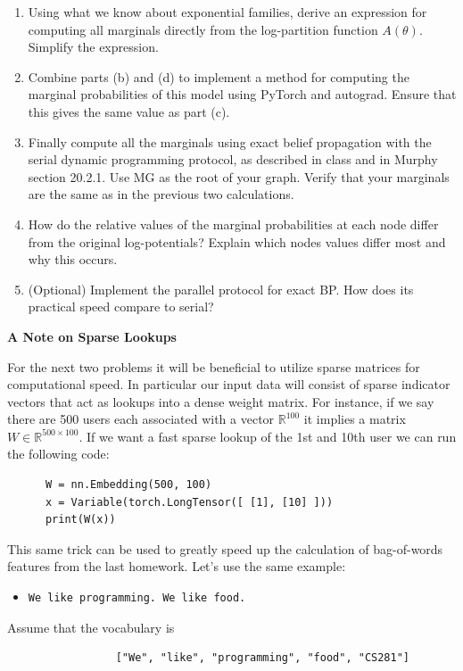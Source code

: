\documentclass[10pt]{harvardml}
\theoremstyle{plain}
\begin{document}
\begin{problem}[30pts]
\begin{enumerate}[label=(\alph*)]
\item Using what we know about exponential families, derive an
  expression for computing all marginals directly from the
  log-partition function $A(\theta)$. Simplify the expression.

\item Combine parts (b) and (d) to implement a method for computing
  the marginal probabilities of this model using PyTorch and
  autograd. Ensure that this gives the same value as part (c).

\item Finally compute all the marginals using exact belief propagation
  with the serial dynamic programming protocol, as described in class
  and in Murphy section 20.2.1. Use MG as the root of your graph.
  Verify that your marginals are the same as in the previous two
  calculations.

\item How do the relative values of the marginal probabilities at each
  node differ from the original log-potentials?  Explain which nodes
  values differ most and why this occurs.


\item (Optional) Implement the parallel protocol for exact BP. How does its practical speed compare to
  serial?
\end{enumerate}


\end{problem}

\newpage

\textbf{A Note on Sparse Lookups}
\vspace{0.5cm}

\noindent For the next two problems it will be beneficial to utilize sparse
matrices for computational speed. In particular our input data will consist
of sparse indicator vectors that act as lookups into a dense weight matrix. For instance, if
we say there are 500 users each associated with a vector
$\mathbb{R}^{100}$ it implies a matrix $W \in \mathbb{R}^{500 \times
  100}$. If we want a fast sparse lookup of the 1st and 10th user we can run
the following code:


\begin{verbatim}
      W = nn.Embedding(500, 100)
      x = Variable(torch.LongTensor([ [1], [10] ]))
      print(W(x))
\end{verbatim}


\noindent

This same trick can be used to greatly speed up
the calculation of bag-of-words features from the
last homework. Let's use the same example:
\begin{itemize}
\item \begin{verbatim}We like programming. We like food.\end{verbatim}
\end{itemize}
Assume that the vocabulary is
\begin{verbatim}
                 ["We", "like", "programming", "food", "CS281"]
\end{verbatim}
\end{document}
